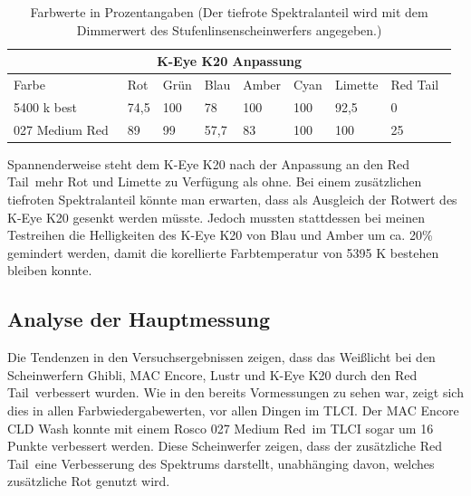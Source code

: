 \begin{table}[htp] 
		\centering
		\begin{tabular}{llllllll}  %
		\toprule
		\multicolumn{8}{c}{\large\sffamily K-Eye K20 Anpassung}\\ 							
		\midrule
		Farbe & Rot & Grün & Blau & Amber & Cyan & Limette &  \glqq Red Tail\grqq\ \\
		 5400 k best & 74,5 & 100 & 78 & 100 & 100 & 92,5 & 0\\
		027 \glqq Medium Red\grqq\ & 89 & 99 & 57,7 & 83 & 100 & 100 & 25\\
		\bottomrule
		\end{tabular}
		\caption{Farbwerte in Prozentangaben (Der tiefrote Spektralanteil wird mit dem Dimmerwert des Stufenlinsenscheinwerfers angegeben.)}	
		\label{t_drehen}
	\end{table}
	
Spannenderweise steht dem K-Eye K20 nach der Anpassung an den \glqq Red Tail\grqq\ mehr Rot und Limette zu Verfügung als ohne. Bei einem zusätzlichen tiefroten Spektralanteil könnte man erwarten, dass als Ausgleich der Rotwert des K-Eye K20 gesenkt werden müsste. Jedoch mussten stattdessen bei meinen Testreihen die Helligkeiten des K-Eye K20 von Blau und Amber um ca. 20\% gemindert werden, damit die korellierte Farbtemperatur von 5395 K bestehen bleiben konnte.
 
\subsection{Analyse der Hauptmessung}
Die Tendenzen in den Versuchsergebnissen zeigen, dass das Weißlicht bei den Scheinwerfern Ghibli, MAC Encore, Lustr und K-Eye K20 durch den \glqq Red Tail\grqq\ verbessert wurden. Wie in den bereits Vormessungen zu sehen war, zeigt sich dies in allen Farbwiedergabewerten, vor allen Dingen  im TLCI. Der MAC Encore CLD Wash konnte mit einem Rosco 027 \glqq Medium Red\grqq\ im TLCI sogar um 16 Punkte verbessert werden. Diese Scheinwerfer zeigen, dass der zusätzliche \glqq Red Tail\grqq\ eine Verbesserung des Spektrums darstellt, unabhänging davon, welches zusätzliche Rot genutzt wird. 

